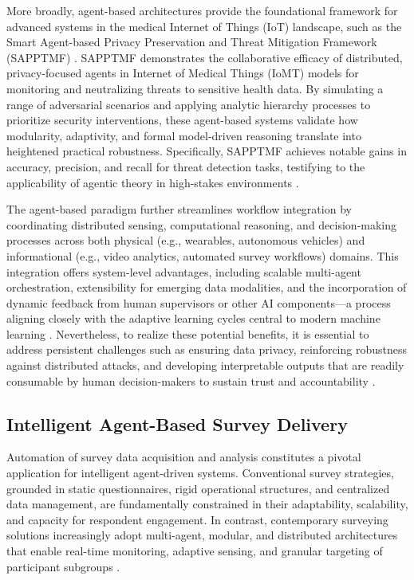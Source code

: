 \documentclass[sigconf]{acmart}
\begin{document}
More broadly, agent-based architectures provide the foundational framework for advanced systems in the medical Internet of Things (IoT) landscape, such as the Smart Agent-based Privacy Preservation and Threat Mitigation Framework (SAPPTMF) \cite{ref19}. SAPPTMF demonstrates the collaborative efficacy of distributed, privacy-focused agents in Internet of Medical Things (IoMT) models for monitoring and neutralizing threats to sensitive health data. By simulating a range of adversarial scenarios and applying analytic hierarchy processes to prioritize security interventions, these agent-based systems validate how modularity, adaptivity, and formal model-driven reasoning translate into heightened practical robustness. Specifically, SAPPTMF achieves notable gains in accuracy, precision, and recall for threat detection tasks, testifying to the applicability of agentic theory in high-stakes environments \cite{ref19}.

The agent-based paradigm further streamlines workflow integration by coordinating distributed sensing, computational reasoning, and decision-making processes across both physical (e.g., wearables, autonomous vehicles) and informational (e.g., video analytics, automated survey workflows) domains. This integration offers system-level advantages, including scalable multi-agent orchestration, extensibility for emerging data modalities, and the incorporation of dynamic feedback from human supervisors or other AI components—a process aligning closely with the adaptive learning cycles central to modern machine learning \cite{ref78,ref80,ref104}. Nevertheless, to realize these potential benefits, it is essential to address persistent challenges such as ensuring data privacy, reinforcing robustness against distributed attacks, and developing interpretable outputs that are readily consumable by human decision-makers to sustain trust and accountability \cite{ref91,ref94,ref98,ref104}.

\subsection{Intelligent Agent-Based Survey Delivery}

Automation of survey data acquisition and analysis constitutes a pivotal application for intelligent agent-driven systems. Conventional survey strategies, grounded in static questionnaires, rigid operational structures, and centralized data management, are fundamentally constrained in their adaptability, scalability, and capacity for respondent engagement. In contrast, contemporary surveying solutions increasingly adopt multi-agent, modular, and distributed architectures that enable real-time monitoring, adaptive sensing, and granular targeting of participant subgroups \cite{ref112}\cite{ref113}\cite{ref117}.
\end{document}
